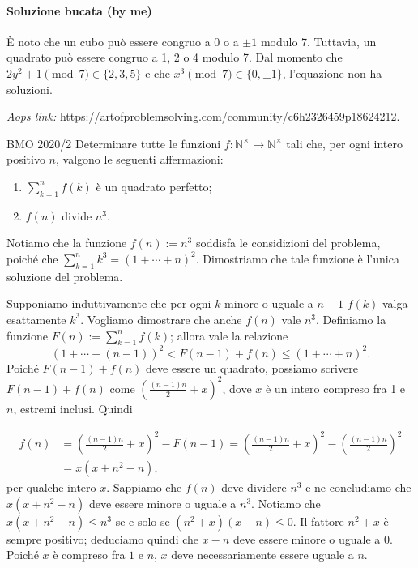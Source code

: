\documentclass{article}
\begin{document}
\paragraph{Soluzione bucata (by me)}
È noto che un cubo può essere congruo a $0$ o a $\pm 1$ modulo 7.
Tuttavia, un quadrato può essere congruo a 1, 2 o 4 modulo 7.
Dal momento che $2y^2+1 \pmod{7} \in \{2,3,5 \}$ e che
$x^3 \pmod{7} \in \{ 0,\pm 1\}$, l'equazione non ha soluzioni.

\vspace{0.5cm}
\textit{Aops link:}
\href{https://artofproblemsolving.com/community/c6h2326459p18624212}
{https://artofproblemsolving.com/community/c6h2326459p18624212}.

\begin{proposition}{BMO 2020/2}{}
	Determinare tutte le funzioni
	$f:\mathbb{N^{\times}}\rightarrow\mathbb{N^{\times}}$ tali che, per ogni
	intero positivo $n$, valgono le seguenti affermazioni:
	\begin{enumerate}
		\item $ \sum_{k=1}^{n} f(k) $ è un quadrato perfetto;
		\item $f(n)$ divide $n^3$.
	\end{enumerate}
\end{proposition}

Notiamo che la funzione $f(n):=n^3$ soddisfa le considizioni
del problema, poiché che $\sum_{k=1}^n k^3=(1+\cdots+n)^2$.
Dimostriamo che tale funzione è l'unica soluzione del problema.

Supponiamo induttivamente che per ogni $k$ minore o uguale a $n-1$
$f(k)$ valga esattamente $k^3$. Vogliamo dimostrare che
anche $f(n)$ vale $n^3$. Definiamo la funzione $F(n):=\sum_{k=1}^n f(k)$;
allora vale la relazione
\begin{equation*}
	(1+\cdots+(n-1))^2<F(n-1)+f(n)\le (1+\cdots+n)^2.
\end{equation*}
Poiché $F(n-1)+f(n)$ deve essere un quadrato,
possiamo scrivere $F(n-1)+f(n)$ come $\left(\frac{(n-1)n}{2}+x\right)^2$, dove
$x$ è un intero compreso fra 1 e $n$, estremi inclusi. Quindi

\begin{align*}
	f(n) &=\left( \frac{(n-1)n}{2}+x \right) ^2-F(n-1)
	=\left( \frac{(n-1)n}{2}+x \right)^2 - \left( \frac{(n-1)n}{2} \right)^2 \\
		  &= x(x+n^2-n),
\end{align*}
per qualche intero $x$. Sappiamo che $f(n)$ deve dividere $n^3$ e ne concludiamo
che $x(x+n^2-n)$ deve essere minore o uguale a $n^3$. Notiamo che
$x(x+n^2-n)\le n^3$ se e solo se $(n^2+x)(x-n)\le 0$. Il fattore $n^2+x$ è
sempre positivo; deduciamo quindi che $x-n$ deve essere minore o uguale a 0.
Poiché $x$ è compreso fra $1$ e $n$, $x$ deve necessariamente essere uguale a $n$.
\end{document}

